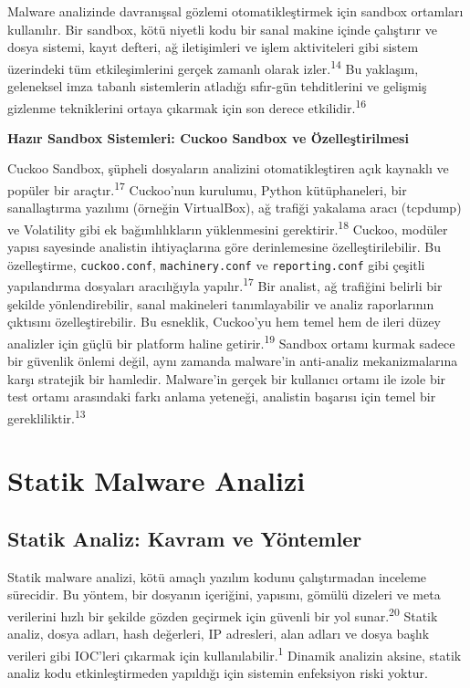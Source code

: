 Malware analizinde davranışsal gözlemi otomatikleştirmek için sandbox ortamları kullanılır. Bir sandbox, kötü niyetli kodu bir sanal makine içinde çalıştırır ve dosya sistemi, kayıt defteri, ağ iletişimleri ve işlem aktiviteleri gibi sistem üzerindeki tüm etkileşimlerini gerçek zamanlı olarak izler.\textsuperscript{14} Bu yaklaşım, geleneksel imza tabanlı sistemlerin atladığı sıfır-gün tehditlerini ve gelişmiş gizlenme tekniklerini ortaya çıkarmak için son derece etkilidir.\textsuperscript{16}

\textbf{Hazır Sandbox Sistemleri: Cuckoo Sandbox ve Özelleştirilmesi}

Cuckoo Sandbox, şüpheli dosyaların analizini otomatikleştiren açık kaynaklı ve popüler bir araçtır.\textsuperscript{17} Cuckoo'nun kurulumu, Python kütüphaneleri, bir sanallaştırma yazılımı (örneğin VirtualBox), ağ trafiği yakalama aracı (tcpdump) ve Volatility gibi ek bağımlılıkların yüklenmesini gerektirir.\textsuperscript{18} Cuckoo, modüler yapısı sayesinde analistin ihtiyaçlarına göre derinlemesine özelleştirilebilir. Bu özelleştirme, \texttt{cuckoo.conf}, \texttt{machinery.conf} ve \texttt{reporting.conf} gibi çeşitli yapılandırma dosyaları aracılığıyla yapılır.\textsuperscript{17} Bir analist, ağ trafiğini belirli bir şekilde yönlendirebilir, sanal makineleri tanımlayabilir ve analiz raporlarının çıktısını özelleştirebilir. Bu esneklik, Cuckoo'yu hem temel hem de ileri düzey analizler için güçlü bir platform haline getirir.\textsuperscript{19} Sandbox ortamı kurmak sadece bir güvenlik önlemi değil, aynı zamanda malware'in anti-analiz mekanizmalarına karşı stratejik bir hamledir. Malware'in gerçek bir kullanıcı ortamı ile izole bir test ortamı arasındaki farkı anlama yeteneği, analistin başarısı için temel bir gerekliliktir.\textsuperscript{13}

\section{Statik Malware Analizi}

\subsection{Statik Analiz: Kavram ve Yöntemler}

Statik malware analizi, kötü amaçlı yazılım kodunu çalıştırmadan inceleme sürecidir. Bu yöntem, bir dosyanın içeriğini, yapısını, gömülü dizeleri ve meta verilerini hızlı bir şekilde gözden geçirmek için güvenli bir yol sunar.\textsuperscript{20} Statik analiz, dosya adları, hash değerleri, IP adresleri, alan adları ve dosya başlık verileri gibi IOC'leri çıkarmak için kullanılabilir.\textsuperscript{1} Dinamik analizin aksine, statik analiz kodu etkinleştirmeden yapıldığı için sistemin enfeksiyon riski yoktur.

